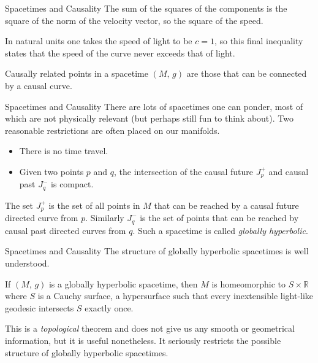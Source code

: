\documentclass{beamer}
\begin{document}
    \begin{frame}{Spacetimes and Causality}
        The sum of the squares of the components is the square of the norm of
        the velocity vector, so the square of the speed.
        \par\hfill\par
        In natural units one takes the speed of light to be $c=1$, so this
        final inequality states that the speed of the curve never exceeds that
        of light.
        \par\hfill\par
        Causally related points in a spacetime $(M,\,g)$ are those that can be
        connected by a causal curve.
    \end{frame}
    \begin{frame}{Spacetimes and Causality}
        There are lots of spacetimes one can ponder, most of which are
        not physically relevant (but perhaps still fun to think about). Two
        reasonable restrictions are often placed on our manifolds.
        \begin{itemize}
            \item There is no time travel.
            \item Given two points $p$ and $q$, the intersection of the causal
                  future $J_{p}^{+}$ and causal past $J_{q}^{-}$ is compact.
        \end{itemize}
        The set $J_{p}^{+}$ is the set of all points in $M$ that can be reached
        by a causal future directed curve from $p$. Similarly $J_{q}^{-}$ is
        the set of points that can be reached by causal past directed curves
        from $q$. Such a spacetime is called \textit{globally hyperbolic}.
    \end{frame}
    \begin{frame}{Spacetimes and Causality}
        The structure of globally hyperbolic spacetimes is well understood.
        \begin{theorem}
            If $(M,\,g)$ is a globally hyperbolic spacetime, then $M$ is
            homeomorphic to $S\times\mathbb{R}$ where $S$ is a Cauchy surface,
            a hypersurface such that every inextensible light-like geodesic
            intersects $S$ exactly once.
        \end{theorem}
        This is a \textit{topological} theorem and does not give us any smooth
        or geometrical information, but it is useful nonetheless. It seriously
        restricts the possible structure of globally hyperbolic spacetimes.
    \end{frame}
\end{document}
